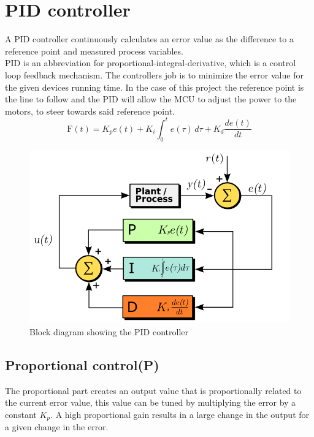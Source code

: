 \section{PID controller} 
A PID controller continuously calculates an error value as the difference to a reference point and measured process variables.\\
PID is an abbreviation for  proportional-integral-derivative, which is a control loop feedback mechanism. The controllers job is to minimize the error value for the given devices running time. In the case of this project the reference point is the line to follow and the PID will allow the MCU to adjust the power to the motors, to steer towards said reference point.
$$\mathrm{F}(t)=K_p{e(t)} + K_{i}\int_{0}^{t}{e(\tau)}\,{d\tau} + K_{d}\frac{de(t)}{dt}$$

\begin{figure}[h!]
  \centering
  \includegraphics[width=1.0\textwidth]{figures/PID_block.png}  
\caption{Block diagram showing the PID controller}   
  \label{PID controller}
\end{figure}

\newpage

\subsection {Proportional control(P)}
The proportional part creates an output value that is proportionally related to the current error value, this value can be tuned by multiplying the error by a constant $K_p$. A high proportional gain results in a large change in the output for a given change in the error. 


